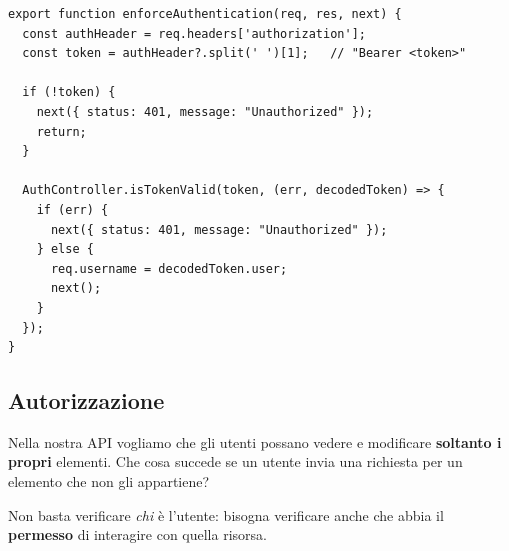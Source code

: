 \begin{affianco}[0.58][c]
\codicepiccolo
\begin{lstlisting}[style=js, name=middleware/auth.js]
export function enforceAuthentication(req, res, next) {
  const authHeader = req.headers['authorization'];
  const token = authHeader?.split(' ')[1];   // "Bearer <token>"

  if (!token) {
    next({ status: 401, message: "Unauthorized" });
    return;
  }

  AuthController.isTokenValid(token, (err, decodedToken) => {
    if (err) {
      next({ status: 401, message: "Unauthorized" });
    } else {
      req.username = decodedToken.user;
      next();
    }
  });
}
\end{lstlisting}
\risultato
\begin{immagine}
\end{immagine}
\end{affianco}

\subsection{Autorizzazione}

Nella nostra API vogliamo che gli utenti possano vedere e modificare
\textbf{soltanto i propri} elementi. Che cosa succede se un utente invia una
richiesta  per un elemento che non gli appartiene?

Non basta verificare \textit{chi} è l'utente: bisogna verificare anche che abbia
il \textbf{permesso} di interagire con quella risorsa.

